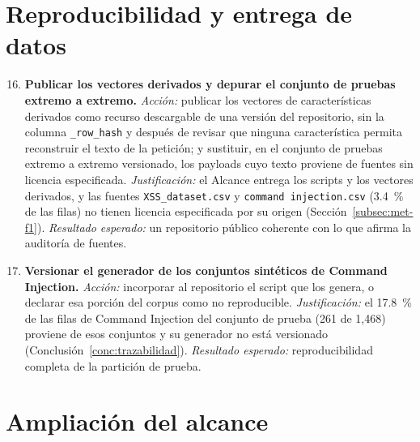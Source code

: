 \section{Reproducibilidad y entrega de datos}

\begin{enumerate}
    \setcounter{enumi}{15}
    \item \textbf{Publicar los vectores derivados y depurar el conjunto de pruebas extremo a
    extremo.} \textit{Acción:} publicar los vectores de características derivados como recurso
    descargable de una versión del repositorio, sin la columna \texttt{\_row\_hash} y después de
    revisar que ninguna característica permita reconstruir el texto de la petición; y sustituir, en
    el conjunto de pruebas extremo a extremo versionado, los payloads cuyo texto proviene de
    fuentes sin licencia especificada. \textit{Justificación:} el Alcance entrega los scripts y los
    vectores derivados, y las fuentes \texttt{XSS\_dataset.csv} y \texttt{command injection.csv}
    (3.4~\% de las filas) no tienen licencia especificada por su origen
    (Sección~\ref{subsec:met-f1}). \textit{Resultado esperado:} un repositorio público coherente
    con lo que afirma la auditoría de fuentes.

    \item \textbf{Versionar el generador de los conjuntos sintéticos de Command Injection.}
    \textit{Acción:} incorporar al repositorio el script que los genera, o declarar esa porción del
    corpus como no reproducible. \textit{Justificación:} el 17.8~\% de las filas de Command
    Injection del conjunto de prueba (261 de 1{,}468) proviene de esos conjuntos y su generador no
    está versionado (Conclusión~\ref{conc:trazabilidad}). \textit{Resultado esperado:}
    reproducibilidad completa de la partición de prueba.
\end{enumerate}

\section{Ampliación del alcance}

